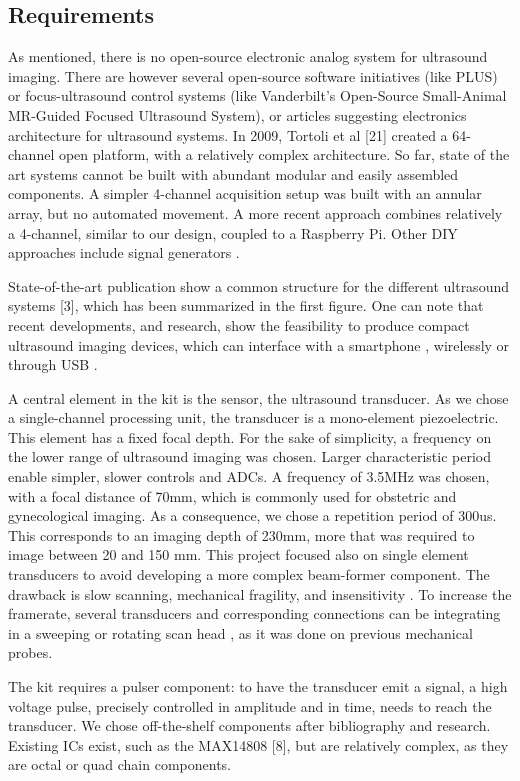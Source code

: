 \documentclass[letterpaper, 10 pt, conference]{ieeeconf} %
\begin{document}
\subsection{Requirements}

As mentioned, there is no open-source electronic analog system for ultrasound imaging. There are however several open-source software initiatives (like PLUS) or focus-ultrasound control systems (like Vanderbilt's Open-Source Small-Animal MR-Guided Focused Ultrasound System), or articles suggesting electronics architecture for ultrasound systems. In 2009, Tortoli et al [21] created a 64-channel open platform, with a relatively complex architecture. So far, state of the art systems cannot be built with abundant modular and easily assembled components. A simpler 4-channel acquisition setup was built with an annular array, but no automated movement. A more recent approach combines relatively a 4-channel\cite{c22}, similar to our design, coupled to a Raspberry Pi. Other DIY approaches include signal generators \cite{c23}.

State-of-the-art publication show a common structure for the different ultrasound systems [3], which has been summarized in the first figure. One can note that recent developments, and research, show the feasibility to produce compact ultrasound imaging devices, which can interface with a smartphone \cite{c8}, wirelessly or through USB \cite{c20}.

A central element in the kit is the sensor, the ultrasound transducer. As we chose a single-channel processing unit, the transducer is a mono-element piezoelectric. This element has a fixed focal depth. For the sake of simplicity, a frequency on the lower range of ultrasound imaging was chosen. Larger characteristic period enable simpler, slower controls and ADCs. A frequency of 3.5MHz was chosen, with a focal distance of 70mm, which is commonly used for obstetric and gynecological imaging. As a consequence, we chose a repetition period of 300us. This corresponds to an imaging depth of 230mm, more that was required to image between 20 and 150 mm. This project focused also on single element transducers to avoid developing a more complex beam-former component. The drawback is slow scanning, mechanical fragility, and insensitivity \cite{c12}. To increase the framerate, several transducers and corresponding connections can be integrating in a sweeping or rotating scan head \cite{c13}, as it was done on previous mechanical probes.

The kit requires a pulser component: to have the transducer emit a signal, a high voltage pulse, precisely controlled in amplitude and in time, needs to reach the transducer. We chose off-the-shelf components after bibliography and research. Existing ICs exist, such as the MAX14808 [8], but are relatively complex, as they are octal or quad chain components.
\end{document}
